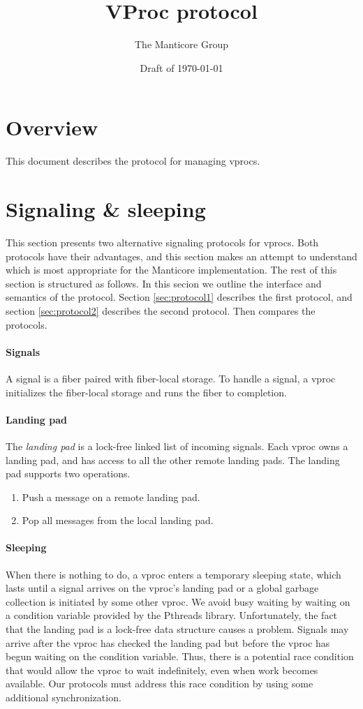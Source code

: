 \documentclass[11pt]{article}
\title{VProc protocol}
\author{The Manticore Group}
\date{Draft of \today}
\begin{document}
\maketitle

\section{Overview}
This document describes the protocol for managing vprocs.

\section{Signaling \& sleeping}\label{sec:signaling-and-sleeping}
This section presents two alternative signaling protocols for vprocs.
Both protocols have their advantages, and this section makes an attempt to understand
which is most appropriate for the Manticore implementation.
The rest of this section is structured as follows.
In this secion we outline the interface and semantics of the protocol.
Section \ref{sec:protocol1} describes the first protocol, and section
\ref{sec:protocol2} describes the second protocol.
Then  compares the protocols.

\paragraph{Signals}
A signal is a fiber paired with fiber-local storage.
To handle a signal, a vproc initializes the fiber-local storage and runs the fiber to completion.

\paragraph{Landing pad}
The \emph{landing pad} is a lock-free linked list of incoming signals.
Each vproc owns a landing pad, and has access to all the other remote landing pads.
The landing pad supports two operations.
\begin{enumerate}
  \item Push a message on a remote landing pad.
  \item Pop all messages from the local landing pad.
\end{enumerate}

\paragraph{Sleeping}
When there is nothing to do, a vproc enters a temporary sleeping state, which lasts until a
signal arrives on the vproc's landing pad or a global garbage collection is initiated by some other
vproc.
We avoid busy waiting by waiting on a condition variable provided by the Pthreads
library.
Unfortunately, the fact that the landing pad is a lock-free data structure causes
a problem.
Signals may arrive after the vproc has checked the landing pad but before the vproc has
begun waiting on the condition variable.
Thus, there is a potential race condition that would allow the vproc to wait indefinitely,
even when work becomes available.
Our protocols must address this race condition by using some additional
synchronization.
\end{document}
